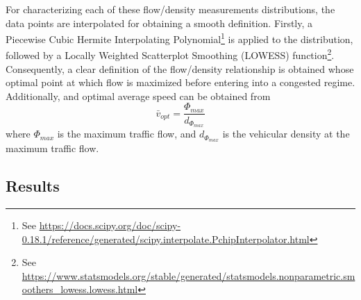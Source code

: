 \documentclass[11pt]{article}
\begin{document}
For characterizing each of these flow/density measurements distributions, the data points are interpolated for obtaining a smooth definition. Firstly, a Piecewise Cubic Hermite Interpolating Polynomial\footnote{See \url{https://docs.scipy.org/doc/scipy-0.18.1/reference/generated/scipy.interpolate.PchipInterpolator.html}} is applied to the distribution, followed by a Locally Weighted Scatterplot Smoothing (LOWESS) function\footnote{See \url{https://www.statsmodels.org/stable/generated/statsmodels.nonparametric.smoothers_lowess.lowess.html}}. Consequently, a clear definition of the flow/density relationship is obtained whose optimal point at which flow is maximized before entering into a congested regime. Additionally, and optimal average speed can be obtained from
\begin{equation}
\bar{v}_{opt}=\frac{\Phi_{max}}{d_{\Phi_{max}}}
\end{equation}
where $\Phi_{max}$ is the maximum traffic flow, and $d_{\Phi_{max}}$ is the vehicular density at the maximum traffic flow.

\subsection{Results}
\end{document}
